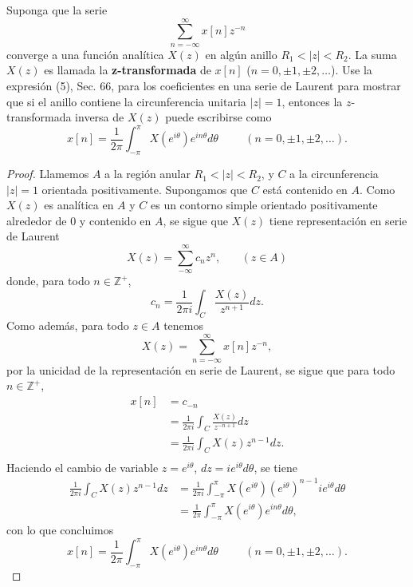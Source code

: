 \begin{exercise}
    Suponga que la serie
    $$
    \sum_{n=-\infty}^{\infty} x[n]z^{-n}
    $$
    converge a una función analítica $X(z)$ en algún anillo $R_1<|z|<R_2$. La suma $X(z)$ es llamada la \textbf{z-transformada} de $x[n]$ ($n=0,\pm 1,\pm 2,\dots$). Use la expresión (5), Sec. 66, para los coeficientes en una serie de Laurent para mostrar que si el anillo contiene la circunferencia unitaria $|z|=1$, entonces la $z$-transformada inversa de $X(z)$ puede escribirse como
    $$
    x[n]=\frac{1}{2\pi}\int_{-\pi}^{\pi} X(e^{i\theta})e^{in\theta}d\theta\hspace{1cm}(n=0,\pm 1, \pm 2,\dots).
    $$
\end{exercise}
\begin{proof}
    Llamemos $A$ a la región anular $R_1<|z|<R_2$, y $C$ a la circunferencia $|z|=1$ orientada positivamente. Supongamos que $C$ está contenido en $A$. Como $X(z)$ es analítica en $A$ y $C$ es un contorno simple orientado positivamente alrededor de $0$ y contenido en $A$, se sigue que $X(z)$ tiene representación en serie de Laurent
    $$
    X(z)=\sum_{-\infty}^{\infty} c_n z^n, \phantom{1cm}(z\in A)
    $$
    donde, para todo $n\in \mathbb{Z}^{+}$,
    $$
    c_n=\frac{1}{2\pi i}\int_{C}\frac{X(z)}{z^{n+1}} dz.
    $$
    Como además, para todo $z\in A$ tenemos
    $$
    X(z)=\sum_{n=-\infty}^{\infty} x[n]z^{-n},
    $$
    por la unicidad de la representación en serie de Laurent, se sigue que para todo $n\in \mathbb{Z}^{+}$,
    $$
    \begin{aligned}
       x[n]&=c_{-n}\\
           &=\frac{1}{2\pi i}\int_{C}\frac{X(z)}{z^{-n+1}} dz\\
           &=\frac{1}{2\pi i}\int_{C}X(z)z^{n-1}dz.\\
    \end{aligned}
    $$
    Haciendo el cambio de variable $z=e^{i\theta}$, $dz=ie^{i\theta}d\theta$, se tiene
    $$
    \begin{aligned}
       \frac{1}{2\pi i}\int_{C}X(z)z^{n-1}dz&=\frac{1}{2\pi i}\int_{-\pi}^{\pi}X(e^{i\theta})({e^{i\theta}})^{n-1}ie^{i\theta}d\theta\\
                                            &=\frac{1}{2\pi}\int_{-\pi}^{\pi} X(e^{i\theta})e^{in\theta}d\theta,
    \end{aligned}
    $$
    con lo que concluimos
    $$
    x[n]=\frac{1}{2\pi}\int_{-\pi}^{\pi} X(e^{i\theta})e^{in\theta}d\theta\hspace{1cm}(n=0,\pm 1, \pm 2,\dots).
    $$
\end{proof}
